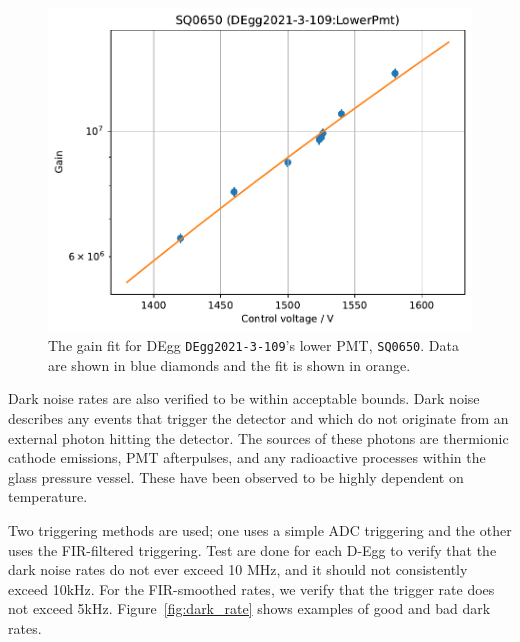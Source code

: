 \documentclass[main.tex]{subfiles}
\begin{document}
\begin{figure}
    \centering
    \includegraphics[width=0.8\linewidth]{figures/gain_curve_SQ0650.pdf}
    \caption{The gain fit for DEgg \texttt{DEgg2021-3-109}'s lower PMT, \texttt{SQ0650}. Data are shown in blue diamonds and the fit is shown in orange.}\label{fig:degg_gain_curve}
\end{figure}

Dark noise rates are also verified to be within acceptable bounds.
Dark noise describes any events that trigger the detector and which do not originate from an external photon hitting the detector. 
The sources of these photons are thermionic cathode emissions, PMT afterpulses, and any radioactive processes within the glass pressure vessel. 
These have been observed to be highly dependent on temperature. 

Two triggering methods are used; one uses a simple ADC triggering and the other uses the FIR-filtered triggering. Test are done for each D-Egg to verify that the dark noise rates do not ever exceed 10 MHz, and it should not consistently exceed 10kHz.
For the FIR-smoothed rates, we verify that the trigger rate does not exceed 5kHz. 
Figure~\ref{fig:dark_rate} shows examples of good and bad dark rates. 
\end{document}
